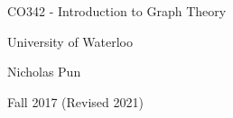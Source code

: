 \documentclass[12pt]{report}
\begin{document}
\begin{titlepage}
  \centering
  \vspace*{2in}
  {\huge CO342 - Introduction to Graph Theory}\par
  \vspace{0.5in}
  {\large University of Waterloo}\par
  {\large Nicholas Pun}\par
  {\large Fall 2017 (Revised 2021)}\par 
\end{titlepage}

\tableofcontents
\clearpage







\nocite{*}


\end{document}
